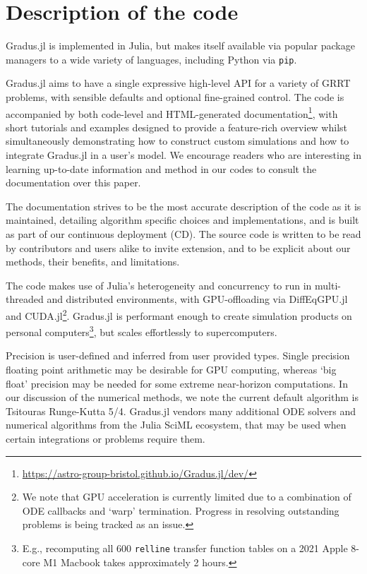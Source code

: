 \section{Description of the code}

Gradus.jl is implemented in Julia, but makes itself available via popular package managers to a wide variety of languages, including Python via \texttt{pip}.

Gradus.jl aims to have a single expressive high-level API for a variety of GRRT problems, with sensible defaults and optional fine-grained control. The code is accompanied by both code-level and HTML-generated documentation\footnote{\url{https://astro-group-bristol.github.io/Gradus.jl/dev/}}, with short tutorials and examples designed to provide a feature-rich overview whilst simultaneously demonstrating how to construct custom simulations and how to integrate Gradus.jl in a user's model. We encourage readers who are interesting in learning up-to-date information and method in our codes to consult the documentation over this paper. 

The documentation strives to be the most accurate description of the code as it is maintained, detailing algorithm specific choices and implementations, and is built as part of our continuous deployment (CD). The source code is written to be read by contributors and users alike to invite extension, and to be explicit about our methods, their benefits, and limitations.

The code makes use of Julia's heterogeneity and concurrency to run in multi-threaded and distributed environments, with GPU-offloading via DiffEqGPU.jl and CUDA.jl\footnote{We note that GPU acceleration is currently limited due to a combination of ODE callbacks and `warp' termination. Progress in resolving outstanding problems is being tracked as an issue.}. Gradus.jl is performant enough to create simulation products on personal computers\footnote{E.g., recomputing all 600 \texttt{relline} transfer function tables \cite{} on a 2021 Apple 8-core M1 Macbook takes approximately 2 hours.}, but scales effortlessly to supercomputers.

Precision is user-defined and inferred from user provided types. Single precision floating point arithmetic may be desirable for GPU computing, whereas `big float' precision may be needed for some extreme near-horizon computations. In our discussion of the numerical methods, we note the current default algorithm is Tsitouras Runge-Kutta 5/4. Gradus.jl vendors many additional ODE solvers and numerical algorithms from the Julia SciML ecosystem, that may be used when certain integrations or problems require them.

